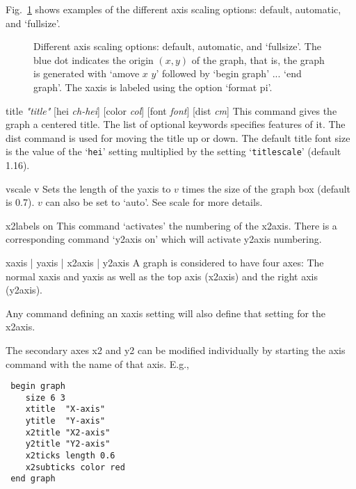\begin{commanddescription}
Fig.~\ref{grscale:fig} shows examples of the different axis scaling options: default, automatic, and `{\sf fullsize}'.

\begin{figure}[tb]
\centering
\mbox{}
\caption{\label{grscale:fig}Different axis scaling options: default, automatic, and `{\sf fullsize}'. The blue dot indicates the origin $(x,y)$ of the graph, that is, the graph is generated with `{\sf amove $x$ $y$}' followed by `{\sf begin graph}' ... `{\sf end graph}'. The xaxis is labeled using the option `{\sf format pi}'.}
\end{figure}

\item[{\sf title {\it "title"}  [hei {\it ch-hei}] [color {\it col}] [font {\it font}] [dist {\it cm}]  }   ]
This command gives the graph a centered title.  The list of optional keywords specifies features of it.  The {\sf dist} command is used for moving the title up or down. The default title font size is the value of the `\texttt{hei}' setting multiplied by the setting `\texttt{titlescale}' (default 1.16).

\item[{\sf vscale v}]
Sets the length of the yaxis to $v$ times the size of the graph box (default is 0.7). $v$ can also be set to `{\sf auto}'. See {\sf scale} for more details.

\item[{\sf x2labels on}]
This command `activates' the numbering of the x2axis.  There is a
corresponding command `{\sf y2axis on}' which will activate y2axis numbering.

\item[{\sf xaxis | yaxis | x2axis | y2axis}]
A graph is considered to have four axes:  The normal xaxis and
yaxis as well as the top axis (x2axis) and the right axis (y2axis).

Any command defining an xaxis setting will also define that setting
for the x2axis.

The secondary axes x2 and y2 can be modified individually by starting the
axis command with the name of that axis. E.g.,

\begin{minipage}[c]{8cm}
\begin{Verbatim}
 begin graph
    size 6 3 
    xtitle  "X-axis"
    ytitle  "Y-axis"
    x2title "X2-axis"
    y2title "Y2-axis"
    x2ticks length 0.6
    x2subticks color red
 end graph
\end{Verbatim}
\end{minipage}
\hfill
\begin{minipage}[c]{7cm}
\mbox{}
\end{minipage}


\end{commanddescription}
